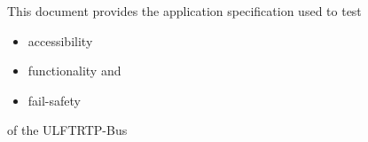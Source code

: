 This document provides the application specification used to test 

\begin{itemize}
\item accessibility
\item functionality and
\item fail-safety
\end{itemize}
of the ULFTRTP-Bus
